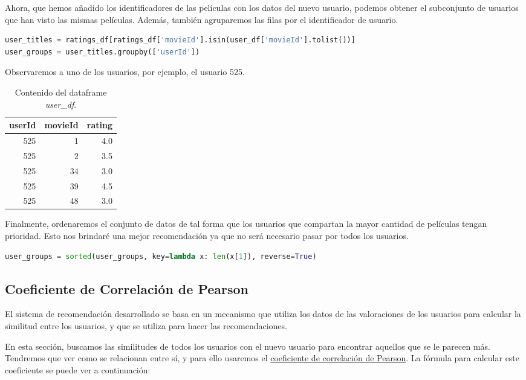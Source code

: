 \documentclass{uimppracticas}
\begin{document}
Ahora, que hemos añadido los identificadores de las películas con los datos del nuevo usuario, podemos obtener el subconjunto de usuarios que han visto las mismas películas. Además, también agruparemos las filas por el identificador de usuario.

\begin{lstlisting}[language=python]
user_titles = ratings_df[ratings_df['movieId'].isin(user_df['movieId'].tolist())]
user_groups = user_titles.groupby(['userId'])
\end{lstlisting}

Observaremos a uno de los usuarios, por ejemplo, el usuario 525.

\begin{table}[h]
	\centering
	\begin{tabular}{rrr}
		\toprule
		userId &  movieId &  rating \\
		\midrule
		525 &        1 &     4.0 \\
		525 &        2 &     3.5 \\
		525 &       34 &     3.0 \\
		525 &       39 &     4.5 \\
		525 &       48 &     3.0 \\
		\bottomrule
	\end{tabular}
	\caption{Contenido del dataframe \textit{user\_df}.}
	\label{user_525}
\end{table}

Finalmente, ordenaremos el conjunto de datos de tal forma que los usuarios que compartan la mayor cantidad de películas tengan prioridad. Esto nos brindaré una mejor recomendación ya que no será necesario pasar por todos los usuarios. 

\begin{lstlisting}[language=python]
user_groups = sorted(user_groups, key=lambda x: len(x[1]), reverse=True)
\end{lstlisting}

\subsection{Coeficiente de Correlación de Pearson}\label{correlacion_pearson}

El sistema de recomendación desarrollado se basa en un mecanismo que utiliza los datos de las valoraciones de los usuarios para calcular la similitud entre los usuarios, y que se utiliza para hacer las recomendaciones.

En esta sección, buscamos las similitudes de todos los usuarios con el nuevo usuario para encontrar aquellos que se le parecen más. Tendremos que ver como se relacionan entre sí, y para ello usaremos el \href{https://es.wikipedia.org/wiki/Coeficiente_de_correlaci\%C3\%B3n_de_Pearson}{coeficiente de correlación de Pearson}. La fórmula para calcular este coeficiente se puede ver a continuación:
\end{document}
